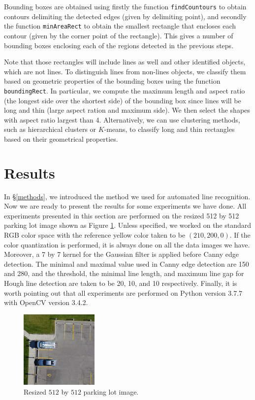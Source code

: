\documentclass{m2pi}
\begin{document}
Bounding boxes are obtained using firstly the function \verb+findCountours+ to obtain contours delimiting the detected edges (given by delimiting point), and secondly the function \verb+minAreaRect+ to obtain the smallest rectangle that encloses each contour (given by the corner point of the rectangle). This gives a number of bounding boxes enclosing each of the regions detected in the previous steps. 

Note that those rectangles will include lines as well and other identified objects, which are not lines. To distinguish lines from non-lines objects, we classify them based on geometric properties of the bounding boxes using the function \verb+boundingRect+. In particular, we compute the maximum length and aspect ratio (the longest side over the shortest side) of the bounding box since lines will be long and thin (large aspect ration and maximum side). We then select the shapes with aspect ratio largest than 4. Alternatively, we can use clustering methods, such as hierarchical clusters or $K$-means, to classify long and thin rectangles based on their geometrical properties.

\section{Results}\label{results}
In \S \ref{methods}, we introduced the method we used for automated 
line recognition. Now we are ready to present the results for some experiments
we have done. 
All experiments presented in this section are performed on the resized 512 
by 512 parking lot image shown as Figure \ref{lot1}. Unless specified, we 
worked on the standard RGB  color space with the reference 
yellow color taken to be $(210, 200, 0)$. If the color quantization is 
performed, it is always done on all the data images we have. Moreover, 
a 7 by 7 kernel for the Gaussian filter is applied before Canny edge
detection. The minimal and maximal value used in Canny edge 
detection are 150 and 280, and the threshold, the minimal line length, and 
maximum line gap for Hough line detection are taken to be 20, 10, and 10 respectively.
Finally, it is worth pointing out that all experiments are performed on 
Python version 3.7.7 with OpenCV version 3.4.2.

\begin{figure}[htp]
\centering
\includegraphics[width=3.8cm]{figures/Resized_Lot1.jpg}
\caption{Resized $512$ by $512$ parking lot image.}
\label{lot1}
\end{figure}
\end{document}
